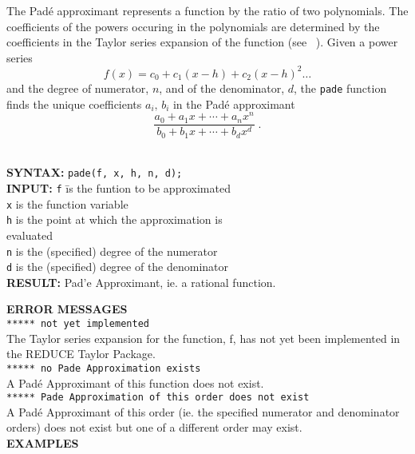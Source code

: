 The Pad\'{e} approximant represents a function by the ratio of two 
polynomials. The coefficients of the powers occuring in the polynomials 
are determined by the coefficients in the Taylor series
expansion of the function (see ~\cite{PA}). Given a power series
\[ f(x) = c_0 + c_1 (x-h) + c_2 (x-h)^2 \ldots \]
and the degree of numerator, $n$, and of the denominator, $d$,
the \texttt{pade} function finds the unique coefficients 
$a_i,\, b_i$ in the Pad\'{e} approximant 
\[ \frac{a_0+a_1 x+ \cdots + a_n x^n}{b_0+b_1 x+ \cdots + b_d x^d} \; .\]
\\[\baselineskip]
%
\hypertarget{PADE:operator}{}
\begin{tabbing}
\textbf{SYNTAX:} \hspace{5mm}\= \texttt{pade(f, x, h, n, d);}\\[\baselineskip]

\textbf{INPUT:}
\> \texttt{f} \hspace{3mm} \= is the funtion to be approximated\\
\> \texttt{x}             \> is the function variable\\
\> \texttt{h}             \> is the point at which the approximation is\\ 
\>                     \> evaluated\\
\> \texttt{n}             \> is the (specified) degree of the numerator\\
\> \texttt{d}             \> is the (specified) degree of the denominator\\[\baselineskip]


\textbf{RESULT:} 
\> Pad\a'{e} Approximant, ie. a rational function.\\[\baselineskip]
\end{tabbing}


\textbf{ERROR MESSAGES}\\
%
\texttt{***** not yet implemented}\\
%
The Taylor series expansion for the function, f, has not yet
been implemented in the {\small REDUCE} Taylor Package.\\[\baselineskip]
%
%
\texttt{***** no Pade Approximation exists}\\
%
A Pad\'{e} Approximant of this function does not exist.\\[\baselineskip]
%
\texttt{***** Pade Approximation of this order does not exist}\\
%
A Pad\'{e} Approximant of this order (ie. the specified
numerator and denominator orders) does not exist but one
of a different order may exist.\\[\baselineskip]
%
%
\large{\textbf{EXAMPLES}}

